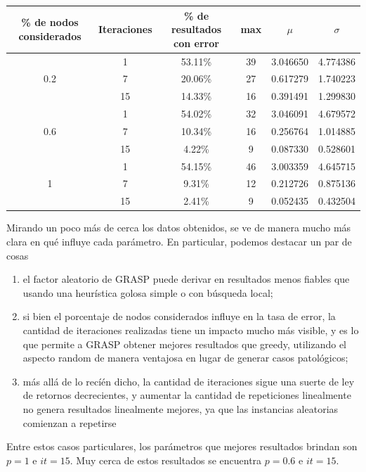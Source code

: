 \begin{center}
    \begin{tabular}{ | c | c | c | c | c | c |}
        \hline
        \% de nodos considerados & Iteraciones & \% de resultados con error & max & $\mu$ & $\sigma$ \\ \hline
         & 1 & 53.11\% & 39 & 3.046650 & 4.774386 \\ \cline{2-6}
        0.2 & 7 & 20.06\% & 27 & 0.617279 & 1.740223 \\ \cline{2-6}
         & 15 & 14.33\% & 16 & 0.391491 & 1.299830 \\ \hline
         & 1 & 54.02\% & 32 & 3.046091 & 4.679572 \\ \cline{2-6}
        0.6 & 7 & 10.34\% & 16 & 0.256764 & 1.014885 \\ \cline{2-6}
         & 15 & 4.22\% & 9 & 0.087330 & 0.528601 \\ \hline
         & 1 & 54.15\% & 46 & 3.003359 & 4.645715 \\ \cline{2-6}
        1 & 7 & 9.31\% & 12 & 0.212726 & 0.875136 \\ \cline{2-6}
         & 15 & 2.41\% & 9 & 0.052435 & 0.432504 \\
        \hline
    \end{tabular}
\end{center}

Mirando un poco más de cerca los datos obtenidos, se ve de manera mucho más clara en qué influye cada parámetro. En particular, podemos destacar un par de cosas

\begin{enumerate}
	\item el factor aleatorio de GRASP puede derivar en resultados menos fiables que usando una heurística golosa simple o con búsqueda local;
	\item si bien el porcentaje de nodos considerados influye en la tasa de error, la cantidad de iteraciones realizadas tiene un impacto mucho más visible, y es lo que permite a GRASP obtener mejores resultados que greedy, utilizando el aspecto random de manera ventajosa en lugar de generar casos patológicos;
	\item más allá de lo recíén dicho, la cantidad de iteraciones sigue una suerte de ley de retornos decrecientes, y aumentar la cantidad de repeticiones linealmente no genera resultados linealmente mejores, ya que las instancias aleatorias comienzan a repetirse
\end{enumerate}

Entre estos casos particulares, los parámetros que mejores resultados brindan son $p = 1$ e $it = 15$. Muy cerca de estos resultados se encuentra $p = 0.6$ e $it = 15$.

